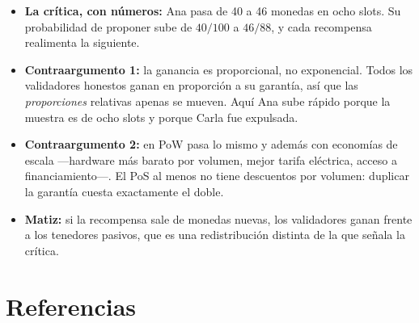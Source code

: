 \documentclass[11pt,a4paper]{article}
\theoremstyle{definition}
\theoremstyle{plain}
\theoremstyle{remark}
\begin{document}
\begin{itemize}
  \item \textbf{La crítica, con números:} Ana pasa de 40 a 46 monedas en ocho
        slots. Su probabilidad de proponer sube de $40/100$ a $46/88$, y cada
        recompensa realimenta la siguiente.
  \item \textbf{Contraargumento 1:} la ganancia es proporcional, no exponencial.
        Todos los validadores honestos ganan en proporción a su garantía, así que
        las \emph{proporciones} relativas apenas se mueven. Aquí Ana sube rápido
        porque la muestra es de ocho slots y porque Carla fue expulsada.
  \item \textbf{Contraargumento 2:} en PoW pasa lo mismo y además con economías
        de escala —hardware más barato por volumen, mejor tarifa eléctrica,
        acceso a financiamiento—. El PoS al menos no tiene descuentos por
        volumen: duplicar la garantía cuesta exactamente el doble.
  \item \textbf{Matiz:} si la recompensa sale de monedas nuevas, los validadores
        ganan frente a los tenedores pasivos, que es una redistribución distinta
        de la que señala la crítica.
\end{itemize}

\section{Referencias}
\end{document}
